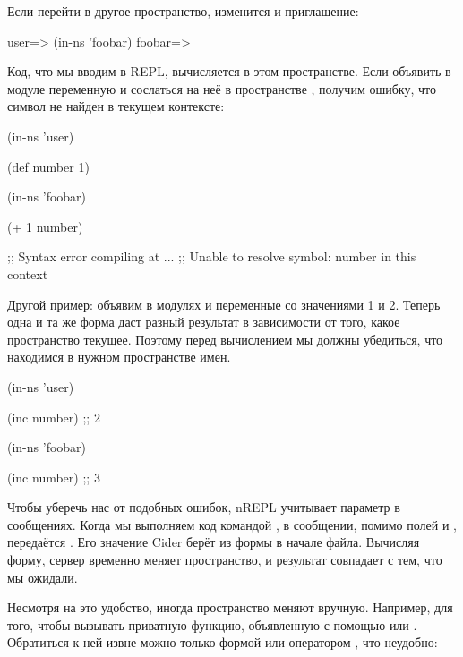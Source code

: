 Если перейти в другое пространство, изменится и приглашение:

\begin{english}
  \begin{clojure}
user=> (in-ns 'foobar)
foobar=>
  \end{clojure}
\end{english}

Код, что мы вводим в REPL, вычисляется в этом пространстве. Если объявить в модуле  переменную  и сослаться на неё в пространстве , получим ошибку, что символ не найден в текущем контексте:

\begin{english}
  \begin{clojure}
(in-ns 'user)

(def number 1)

(in-ns 'foobar)

(+ 1 number)

;; Syntax error compiling at ...
;; Unable to resolve symbol: number in this context
  \end{clojure}
\end{english}

Другой пример: объявим в модулях  и  переменные  со значениями 1 и 2. Теперь одна и та же форма  даст разный результат в зависимости от того, какое пространство текущее. Поэтому перед вычислением мы должны убедиться, что находимся в нужном пространстве имен.

\begin{english}
  \begin{clojure}
(in-ns 'user)

(inc number) ;; 2

(in-ns 'foobar)

(inc number) ;; 3
  \end{clojure}
\end{english}

Чтобы уберечь нас от подобных ошибок, nREPL учитывает параметр  в сообщениях. Когда мы выполняем код командой , в сообщении, помимо полей  и , передаётся . Его значение Cider берёт из формы  в начале файла. Вычисляя форму, сервер временно меняет пространство, и результат совпадает с тем, что мы ожидали.

Несмотря на это удобство, иногда пространство меняют вручную. Например, для того, чтобы вызывать приватную функцию, объявленную с помощью  или . Обратиться к ней извне можно только формой  или оператором , что неудобно:

